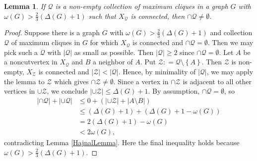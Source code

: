\documentclass[openany]{tufte-book} %
\theoremstyle{plain}
\newtheorem{lemma}{Lemma}
\newcommand{\set}[1]{\left\{ #1 \right\}}
\newcommand{\card}[1]{\left|#1\right|}
\newcommand{\DefinedAs}{\mathrel{\mathop:}=}
\newcommand{\fancy}[1]{\mathcal{#1}}
\newcommand{\Q}{\fancy{Q}}
\newcommand{\Z}{\fancy{Z}}
\begin{document}
\begin{lemma}\label{KostochkaCliqueGraph}
If $\Q$ is a non-empty collection of maximum cliques in a graph $G$ with $\omega(G) > \frac23 (\Delta(G) + 1)$ such that $X_\Q$ is connected, then $\cap \Q \ne \emptyset$. 
\end{lemma}
\begin{proof}
Suppose there is a graph $G$ with $\omega(G) > \frac23 (\Delta(G) + 1)$ and collection $\Q$ of maximum cliques in $G$ for which $X_\Q$ is connected and $\cap \Q = \emptyset$.
Then we may pick such a $\Q$ with $|\mathcal{Q}|$ as small as possible. Then $|\mathcal{Q}| \ge 2$ since $\cap \Q = \emptyset$. Let $A$ be a noncutvertex in $X_{\Q}$ and
$B$ a neighbor of $A$. Put $\fancy{Z} \DefinedAs \Q \setminus \set{A}$. Then $\Z$ is non-empty,
$X_{\fancy{Z}}$ is connected and $\card{\Z} < \card{\Q}$. Hence, by minimality of $|\mathcal{Q}|$, we may apply the lemma to $\Z$ which gives $\cap \fancy{Z}
\ne \emptyset$. Since a vertex in $\cap \Z$ is adjacent to all other vertices in $\cup \Z$, we conclude $\card{\cup \fancy{Z}} \le \Delta(G) + 1$.
By assumption, $\cap\Q=\emptyset$, so 
\begin{align*}
\card{\cap \Q} + \card{\cup \Q} &\le 0 + (\card{\cup \fancy{Z}} + \card{A \setminus B})\\
&\le (\Delta(G) + 1) + (\Delta(G)+1 - \omega(G)) \\
&= 2(\Delta(G) + 1) - \omega(G) \\
&< 2\omega(G), 
\end{align*}
contradicting Lemma \ref{HajnalLemma}.  Here the final inequality holds because $\omega(G) > \frac23 (\Delta(G) + 1)$.
\end{proof}
\end{document}
